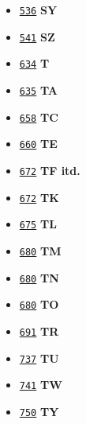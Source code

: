 \documentclass[12]{mwart}
\begin{document}
\begin{itemize}
\item \href{\pav{5}{544}}{\texttt{536}} \textbf{SY}
\item \href{\pav{5}{549}}{\texttt{541}} \textbf{SZ}
\item \href{\pav{5}{642}}{\texttt{634}} \textbf{T}
\item \href{\pav{5}{643}}{\texttt{635}} \textbf{TA}
\item \href{\pav{5}{666}}{\texttt{658}} \textbf{TC}
\item \href{\pav{5}{668}}{\texttt{660}} \textbf{TE}
\item \href{\pav{5}{680}}{\texttt{672}} \textbf{TF itd.}
\item \href{\pav{5}{680}}{\texttt{672}} \textbf{TK}
\item \href{\pav{5}{683}}{\texttt{675}} \textbf{TL}
\item \href{\pav{5}{688}}{\texttt{680}} \textbf{TM}
\item \href{\pav{5}{688}}{\texttt{680}} \textbf{TN}
\item \href{\pav{5}{688}}{\texttt{680}} \textbf{TO}
\item \href{\pav{5}{691}}{\texttt{691}} \textbf{TR}
\item \href{\pav{5}{745}}{\texttt{737}} \textbf{TU}
\item \href{\pav{5}{749}}{\texttt{741}} \textbf{TW}
\item \href{\pav{5}{758}}{\texttt{750}} \textbf{TY}



\end{itemize}
\end{document}

